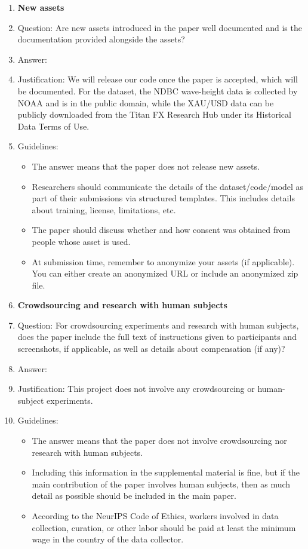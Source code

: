 \documentclass{article}
\begin{document}
\begin{enumerate}
\item {\bf New assets}
    \item[] Question: Are new assets introduced in the paper well documented and is the documentation provided alongside the assets?
    \item[] Answer: \answerYes{} %
    \item[] Justification: We will release our code once the paper is accepted, which will be documented. For the dataset, the NDBC wave-height data is collected by NOAA and is in the public domain, while the XAU/USD data can be publicly downloaded from the Titan FX Research Hub under its Historical Data Terms of Use.
    \item[] Guidelines:
    \begin{itemize}
        \item The answer \answerNA{} means that the paper does not release new assets.
        \item Researchers should communicate the details of the dataset\slash code\slash model as part of their submissions via structured templates. This includes details about training, license, limitations, etc. 
        \item The paper should discuss whether and how consent was obtained from people whose asset is used.
        \item At submission time, remember to anonymize your assets (if applicable). You can either create an anonymized URL or include an anonymized zip file.
    \end{itemize}

\item {\bf Crowdsourcing and research with human subjects}
    \item[] Question: For crowdsourcing experiments and research with human subjects, does the paper include the full text of instructions given to participants and screenshots, if applicable, as well as details about compensation (if any)? 
    \item[] Answer: \answerNA{} %
    \item[] Justification: This project does not involve any crowdsourcing or human-subject experiments.
    \item[] Guidelines:
    \begin{itemize}
        \item The answer \answerNA{} means that the paper does not involve crowdsourcing nor research with human subjects.
        \item Including this information in the supplemental material is fine, but if the main contribution of the paper involves human subjects, then as much detail as possible should be included in the main paper. 
        \item According to the NeurIPS Code of Ethics, workers involved in data collection, curation, or other labor should be paid at least the minimum wage in the country of the data collector. 
    \end{itemize}


\end{enumerate}
\end{document}
